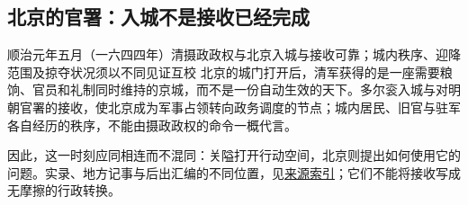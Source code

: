 \subsection{北京的官署：入城不是接收已经完成}
\begin{event}{}{顺治元年五月（一六四四年）}{清摄政政权与北京}{入城与接收可靠；城内秩序、迎降范围及掠夺状况须以不同见证互校}
北京的城门打开后，清军获得的是一座需要粮饷、官员和礼制同时维持的京城，而不是一份自动生效的天下。多尔衮入城与对明朝官署的接收，使北京成为军事占领转向政务调度的节点；城内居民、旧官与驻军各自经历的秩序，不能由摄政政权的命令一概代言。

因此，这一时刻应同相连而不混同：关隘打开行动空间，北京则提出如何使用它的问题。实录、地方记事与后出汇编的不同位置，见\hyperref[app:sources]{来源索引}；它们不能将接收写成无摩擦的行政转换。
\end{event}
